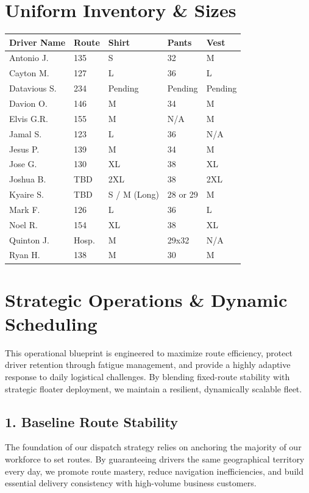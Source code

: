 \documentclass[11pt]{article}
\begin{document}
\vspace{3em}
\section{Uniform Inventory \& Sizes}
\label{sec:org46663cb}

\begin{center}
\begin{tabular}{l l l l l}
\toprule
Driver Name & Route & Shirt & Pants & Vest\\
\midrule
Antonio J. & 135 & S & 32 & M\\
Cayton M. & 127 & L & 36 & L\\
Datavious S. & 234 & Pending & Pending & Pending\\
Davion O. & 146 & M & 34 & M\\
Elvis G.R. & 155 & M & N/A & M\\
Jamal S. & 123 & L & 36 & N/A\\
Jesus P. & 139 & M & 34 & M\\
Jose G. & 130 & XL & 38 & XL\\
Joshua B. & TBD & 2XL & 38 & 2XL\\
Kyaire S. & TBD & S / M (Long) & 28 or 29 & M\\
Mark F. & 126 & L & 36 & L\\
Noel R. & 154 & XL & 38 & XL\\
Quinton J. & Hosp. & M & 29x32 & N/A\\
Ryan H. & 138 & M & 30 & M\\
\bottomrule
\end{tabular}
\end{center}

\newpage
\section{Strategic Operations \& Dynamic Scheduling}
\label{sec:org46e3cf2}

This operational blueprint is engineered to maximize route efficiency, protect driver retention through fatigue management, and provide a highly adaptive response to daily logistical challenges. By blending fixed-route stability with strategic floater deployment, we maintain a resilient, dynamically scalable fleet.
\subsection{1. Baseline Route Stability}
\label{sec:org6ab3c87}
The foundation of our dispatch strategy relies on anchoring the majority of our workforce to set routes. By guaranteeing drivers the same geographical territory every day, we promote route mastery, reduce navigation inefficiencies, and build essential delivery consistency with high-volume business customers.
\end{document}
